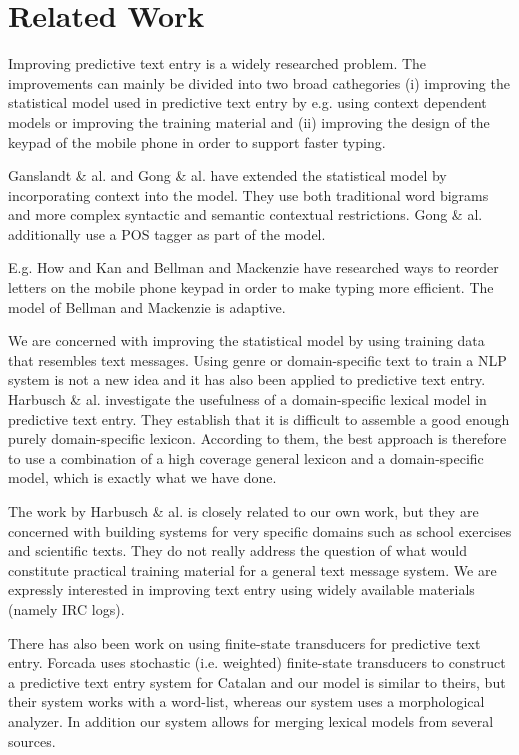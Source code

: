 \documentclass[a4paper,conference]{IEEEtran}
\begin{document}
\section{Related Work}
\label{sec:related-work}

Improving predictive text entry is a widely researched problem. The
improvements can mainly be divided into two broad cathegories (i)
improving the statistical model used in predictive text entry by
e.g. using context dependent models or improving the training material
and (ii) improving the design of the keypad of the mobile phone in
order to support faster typing.

Ganslandt \& al. \cite{ganslandt/2009} and Gong \&
al. \cite{gong/2008} have extended the statistical model by
incorporating context into the model. They use both traditional word
bigrams and more complex syntactic and semantic contextual
restrictions. Gong \& al. additionally use a POS tagger as part of the
model.

E.g. How and Kan \cite{how05optimizing} and Bellman and Mackenzie
\cite{Department98aprobabilistic} have researched ways to reorder
letters on the mobile phone keypad in order to make typing more
efficient. The model of Bellman and Mackenzie is adaptive.

We are concerned with improving the statistical model by using
training data that resembles text messages. Using genre or
domain-specific text to train a NLP system is not a new idea and it
has also been applied to predictive text entry. Harbusch \&
al. \cite{Harbusch/2003} investigate the usefulness of a
domain-specific lexical model in predictive text entry. They establish
that it is difficult to assemble a good enough purely domain-specific
lexicon. According to them, the best approach is therefore to use a
combination of a high coverage general lexicon and a domain-specific
model, which is exactly what we have done.

The work by Harbusch \& al. is closely related to our own work, but they
are concerned with building systems for very specific domains such as
school exercises and scientific texts. They do not really address the
question of what would constitute practical training material for a
general text message system. We are expressly interested in improving
text entry using widely available materials (namely IRC logs).

There has also been work on using finite-state transducers for
predictive text entry. Forcada \cite{Forcada01corpus-basedstochastic} uses
stochastic (i.e. weighted) finite-state transducers to construct a
predictive text entry system for Catalan and our model is similar to
theirs, but their system works with a word-list, whereas our system
uses a morphological analyzer.  In addition our system allows for
merging lexical models from several sources.
 
\end{document}
